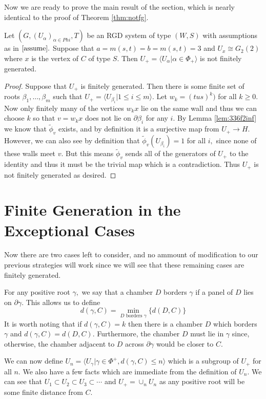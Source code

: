 \documentclass[class=book, crop=false]{standalone}
\begin{document}
Now we are ready to prove the main result of the section, which is nearly identical to the proof of Theorem \ref{thm:notfg}.
\begin{theorem}
	\label{thm:336f2notfg}
	Let $(G,(U_\alpha)_{\alpha\in Phi},T)$ be an RGD system of type $(W,S)$ with assumptions as in $\eqref{assume}.$ Suppose that $a=m(s,t)=b=m(s,t)=3$ and $U_x\cong G_2(2)$ where $x$ is the vertex of $C$ of type $S.$ Then $U_+=\langle U_\alpha|\alpha\in \Phi_+\rangle$ is not finitely generated.
\end{theorem}
\begin{proof}
	Suppose that $U_+$ is finitely generated. Then there is some finite set of roots $\beta_1,\dots,\beta_m$ such that $U_+=\langle U_{\beta_i}|1\le i\le m\rangle.$ Let $w_k=(tus)^k)$ for all $k\ge 0.$ Now only finitely many of the vertices $w_kx$ lie on the same wall and thus we can choose $k$ so that $v=w_kx$ does not lie on $\partial \beta_i$ for any $i.$ By Lemma \ref{lem:336f2inf} we know that $\tilde{\phi}_v$ exists, and by definition it is a surjective map from $U_+\to H.$ However, we can also see by definition that $\tilde{\phi}_v(U_{\beta_i})=1$ for all $i,$ since none of these walls meet $v.$ But this means $\tilde{\phi}_v$ sends all of the generators of $U_+$ to the identity and thus it must be the trivial map which is a contradiction. Thus $U_+$ is not finitely generated as desired.
\end{proof}

\section{Finite Generation in the Exceptional Cases}
Now there are two cases left to consider, and no ammount of modification to our previous strategies will work since we will see that these remaining cases are finitely generated. 

For any positive root $\gamma,$ we say that a chamber $D$ borders $\gamma$ if a panel of $D$ lies on $\partial \gamma.$ This allows us to define
\[
	d(\gamma,C)=\min_{D\text{ borders }\gamma} \{d(D,C)\}
\]
It is worth noting that if $d(\gamma,C)=k$ then there is a chamber $D$ which borders $\gamma$ and $d(\gamma,C)=d(D,C).$ Furthermore, the chamber $D$ must lie in $\gamma$ since, otherwise, the chamber adjacent to $D$ across $\partial\gamma$ would be closer to $C.$

We can now define $U_n=\langle U_{\gamma}|\gamma\in \Phi^+, d(\gamma,C)\le n\rangle$ which is a subgroup of $U_+$ for all $n.$ We also have a few facts which are immediate from the definition of $U_n.$ We can see that $U_1\subset U_2\subset U_3\subset \cdots$ and $U_+=\cup_{n}U_n$ as any positive root will be some finite distance from $C.$ 
\end{document}
